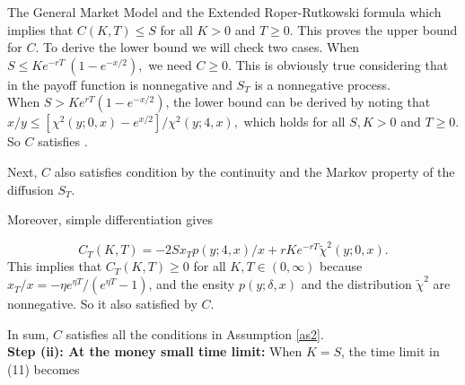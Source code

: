 \documentclass[unknownkeysallowed, compress]{beamer}
\theoremstyle{plain}
\begin{document}
\begin{frame}[allowframebreaks]{The General Market Model and the Extended Roper-Rutkowski formula}
which implies that $C(K, T) \leq S$ for all $K > 0$ and $T \geq  0.$ This proves the upper bound for $C.$ To derive the lower bound we will
check two cases. When $S \leq Ke^{-rT} ~(1 - e^{-x/2}),$ we need $C \geq 0$. This is obviously true
considering that in %
the payoff function is nonnegative and $S_T$ is a nonnegative process.\\
When $S > Ke^{rT}(1 -  e^{-x/2})$, the lower bound %
can be derived by noting that $x/y\leq
[\chi^2(y; 0, x) - e^{x/2}]/\chi^2(y; 4, x),$ which holds for all $S, K > 0$ and $T \geq 0$. So $C$ satisfies .\\%

\par Next, $C$ also satisfies condition %
by the continuity and the Markov property of the
diffusion $S_T$.\\

\par Moreover, simple differentiation gives

\begin{equation}\label{32}
C_T(K,T) = -2Sx_Tp(y;4,x)/x+rKe^{-rT}\tilde{\chi}^2(y;0,x).
\end{equation}
This implies that $C_T(K,T)\geq 0$ for all $K,T\in(0,\infty)$ because $x_T/x = -\eta e^{\eta T}/(e^{\eta T}-1)$, and the ensity $p(y;\delta,x)$ and the distribution $\tilde{\chi}^2$ are nonnegative. So %
it also  satisfied by $C$.\\

\par In sum, $C$ satisfies all the conditions %
in Assumption \ref{as2}.\\

\textbf{Step (ii): At the money small time limit:} When $K = S$, the time limit in (11) becomes


\end{frame}
\end{document}
